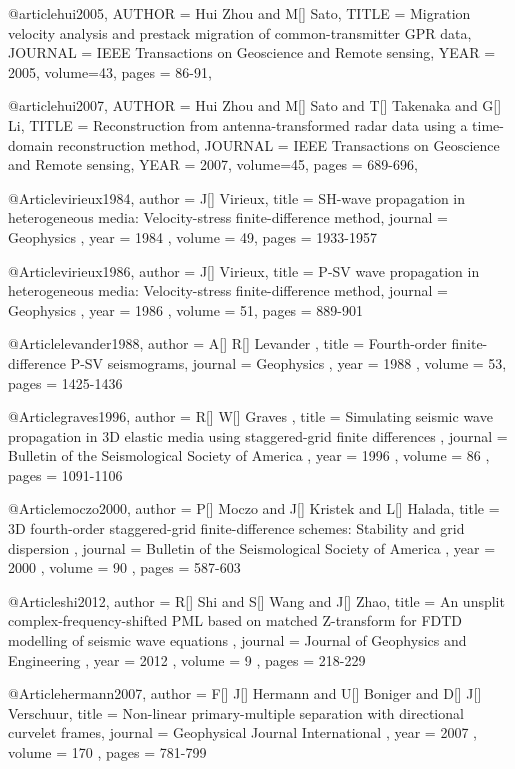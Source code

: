{@article{hui2005,
  AUTHOR =       {Hui Zhou and M[] Sato},
  TITLE =        {Migration velocity analysis and prestack migration of common-transmitter GPR data},
  JOURNAL =      {IEEE Transactions on Geoscience and Remote sensing},
  YEAR =         {2005},
  volume=43,
  pages = {86-91},
}

@article{hui2007,
  AUTHOR =       {Hui Zhou and M[] Sato and T[] Takenaka and G[] Li},
  TITLE =        {Reconstruction from antenna-transformed radar data using a time-domain reconstruction method},
  JOURNAL =      {IEEE Transactions on Geoscience and Remote sensing},
  YEAR =         {2007},
  volume=45,
  pages = {689-696},
}

@Article{virieux1984,
 author =  { J[] Virieux},
 title =   { SH-wave propagation in heterogeneous media: Velocity-stress finite-difference method},
 journal = { Geophysics },
 year =    { 1984 },
 volume =  { 49},
 pages =   { 1933-1957 }
}

@Article{virieux1986,
 author =  { J[] Virieux},
 title =   { P-SV wave propagation in heterogeneous media: Velocity-stress finite-difference method},
 journal = { Geophysics },
 year =    { 1986 },
 volume =  { 51},
 pages =   { 889-901 }
}

@Article{levander1988,
 author =  { A[] R[] Levander },
 title =   { Fourth-order finite-difference P-SV seismograms},
 journal = { Geophysics },
 year =    { 1988 },
 volume =  { 53},
 pages =   { 1425-1436 }
}

@Article{graves1996,
 author =  { R[] W[] Graves },
 title =   { Simulating seismic wave propagation in 3{D} elastic media using staggered-grid finite differences },
 journal = { Bulletin of the Seismological Society of America },
 year =    { 1996 },
 volume =  { 86 },
 pages =   { 1091-1106 }
}

@Article{moczo2000,
 author =  {  P[] Moczo and J[] Kristek and L[] Halada},
 title =   { 3{D} fourth-order staggered-grid finite-difference schemes: Stability and grid dispersion },
 journal = { Bulletin of the Seismological Society of America },
 year =    { 2000 },
 volume =  { 90 },
 pages =   { 587-603 }
}


@Article{shi2012,
 author =  {  R[] Shi and S[] Wang and J[] Zhao},
 title =   {An unsplit complex-frequency-shifted PML based on matched Z-transform for FDTD modelling of seismic wave equations },
 journal = { Journal of Geophysics and Engineering },
 year =    { 2012 },
 volume =  { 9 },
 pages =   { 218-229 }
}

@Article{hermann2007,
 author =  {  F[] J[] Hermann and U[] Boniger and D[] J[] Verschuur},
 title =   {Non-linear primary-multiple separation with directional curvelet frames},
 journal = { Geophysical Journal International },
 year =    { 2007 },
 volume =  { 170 },
 pages =   { 781-799 }
}

}
